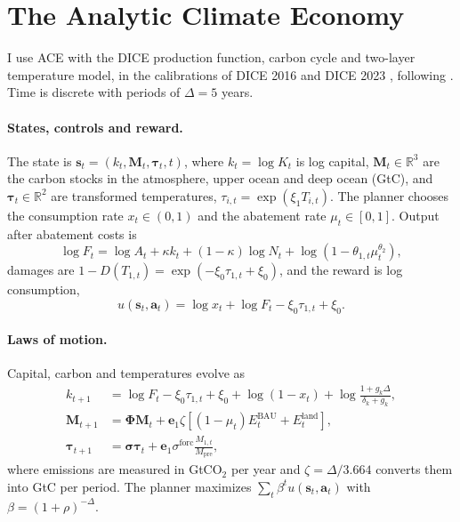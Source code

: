 \section{The Analytic Climate Economy}
\label{sec:model}

I use ACE \parencite{TraegerChristian2023ACE} with the DICE production function, carbon cycle and two-layer temperature model, in the calibrations of DICE 2016 \parencite{NordhausWilliam2018PaUa} and DICE 2023 \parencite{NordhausWilliam2023}, following \textcite{traeger2021analytic_discussion}. Time is discrete with periods of \(\Delta = 5\) years.

\paragraph{States, controls and reward.} The state is \(\bm{s}_t = (k_t, \bm{M}_t, \bm{\tau}_t, t)\), where \(k_t = \log K_t\) is log capital, \(\bm{M}_t \in \mathbb{R}^3\) are the carbon stocks in the atmosphere, upper ocean and deep ocean (GtC), and \(\bm{\tau}_t \in \mathbb{R}^2\) are transformed temperatures, \(\tau_{i,t} = \exp(\xi_1 T_{i,t})\). The planner chooses the consumption rate \(x_t \in (0,1)\) and the abatement rate \(\mu_t \in [0,1]\). Output after abatement costs is
\begin{equation}
    \log F_t = \log A_t + \kappa k_t + (1-\kappa)\log N_t + \log\left(1 - \theta_{1,t}\mu_t^{\theta_2}\right),
\end{equation}
damages are \(1 - D(T_{1,t}) = \exp(-\xi_0 \tau_{1,t} + \xi_0)\), and the reward is log consumption,
\begin{equation}
    u(\bm{s}_t, \bm{a}_t) = \log x_t + \log F_t - \xi_0\tau_{1,t} + \xi_0 .
\end{equation}

\paragraph{Laws of motion.} Capital, carbon and temperatures evolve as
\begin{align}
    k_{t+1} &= \log F_t - \xi_0 \tau_{1,t} + \xi_0 + \log(1 - x_t) + \log\frac{1 + g_k\Delta}{\delta_k + g_k}, \\
    \bm{M}_{t+1} &= \bm{\Phi}\bm{M}_t + \bm{e}_1 \zeta \left[(1-\mu_t)E^{\text{BAU}}_t + E^{\text{land}}_t\right], \\
    \bm{\tau}_{t+1} &= \bm{\sigma}\bm{\tau}_t + \bm{e}_1 \sigma^{\text{forc}} \frac{M_{1,t}}{M_{\text{pre}}},
\end{align}
where emissions are measured in GtCO\(_2\) per year and \(\zeta = \Delta/3.664\) converts them into GtC per period. The planner maximizes \(\sum_t \beta^t u(\bm{s}_t, \bm{a}_t)\) with \(\beta = (1+\rho)^{-\Delta}\).

